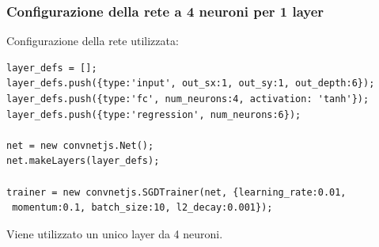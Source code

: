 \subsubsection{Configurazione della rete a 4 neuroni per 1 layer}
\label{Configurazione della rete a 4 neuroni per 1 layer}

Configurazione della rete utilizzata:\\
\begin{verbatim}layer_defs = [];
layer_defs.push({type:'input', out_sx:1, out_sy:1, out_depth:6});
layer_defs.push({type:'fc', num_neurons:4, activation: 'tanh'});
layer_defs.push({type:'regression', num_neurons:6});

net = new convnetjs.Net();
net.makeLayers(layer_defs);

trainer = new convnetjs.SGDTrainer(net, {learning_rate:0.01,
 momentum:0.1, batch_size:10, l2_decay:0.001});
\end{verbatim}
\noindent
Viene utilizzato un unico layer da 4 neuroni.

